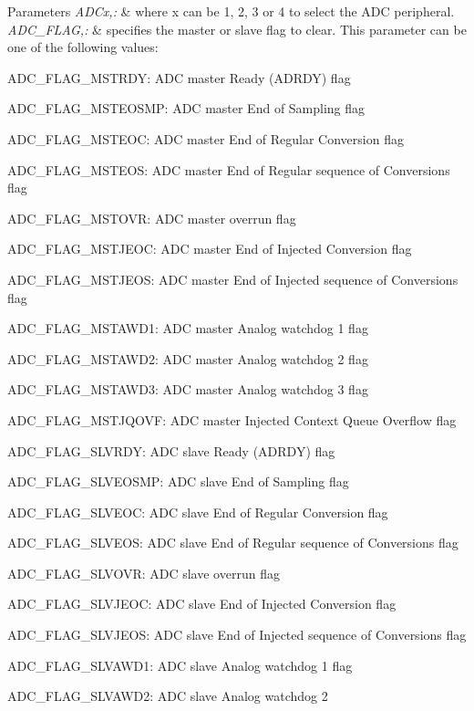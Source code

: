 \begin{DoxyParams}{Parameters}
{\em A\-D\-Cx,\-:} & where x can be 1, 2, 3 or 4 to select the A\-D\-C peripheral. \\
\hline
{\em A\-D\-C\-\_\-\-F\-L\-A\-G,\-:} & specifies the master or slave flag to clear. This parameter can be one of the following values\-: \begin{DoxyItemize}
\item A\-D\-C\-\_\-\-F\-L\-A\-G\-\_\-\-M\-S\-T\-R\-D\-Y\-: A\-D\-C master Ready (A\-D\-R\-D\-Y) flag \item A\-D\-C\-\_\-\-F\-L\-A\-G\-\_\-\-M\-S\-T\-E\-O\-S\-M\-P\-: A\-D\-C master End of Sampling flag \item A\-D\-C\-\_\-\-F\-L\-A\-G\-\_\-\-M\-S\-T\-E\-O\-C\-: A\-D\-C master End of Regular Conversion flag \item A\-D\-C\-\_\-\-F\-L\-A\-G\-\_\-\-M\-S\-T\-E\-O\-S\-: A\-D\-C master End of Regular sequence of Conversions flag \item A\-D\-C\-\_\-\-F\-L\-A\-G\-\_\-\-M\-S\-T\-O\-V\-R\-: A\-D\-C master overrun flag \item A\-D\-C\-\_\-\-F\-L\-A\-G\-\_\-\-M\-S\-T\-J\-E\-O\-C\-: A\-D\-C master End of Injected Conversion flag \item A\-D\-C\-\_\-\-F\-L\-A\-G\-\_\-\-M\-S\-T\-J\-E\-O\-S\-: A\-D\-C master End of Injected sequence of Conversions flag \item A\-D\-C\-\_\-\-F\-L\-A\-G\-\_\-\-M\-S\-T\-A\-W\-D1\-: A\-D\-C master Analog watchdog 1 flag \item A\-D\-C\-\_\-\-F\-L\-A\-G\-\_\-\-M\-S\-T\-A\-W\-D2\-: A\-D\-C master Analog watchdog 2 flag \item A\-D\-C\-\_\-\-F\-L\-A\-G\-\_\-\-M\-S\-T\-A\-W\-D3\-: A\-D\-C master Analog watchdog 3 flag \item A\-D\-C\-\_\-\-F\-L\-A\-G\-\_\-\-M\-S\-T\-J\-Q\-O\-V\-F\-: A\-D\-C master Injected Context Queue Overflow flag \item A\-D\-C\-\_\-\-F\-L\-A\-G\-\_\-\-S\-L\-V\-R\-D\-Y\-: A\-D\-C slave Ready (A\-D\-R\-D\-Y) flag \item A\-D\-C\-\_\-\-F\-L\-A\-G\-\_\-\-S\-L\-V\-E\-O\-S\-M\-P\-: A\-D\-C slave End of Sampling flag \item A\-D\-C\-\_\-\-F\-L\-A\-G\-\_\-\-S\-L\-V\-E\-O\-C\-: A\-D\-C slave End of Regular Conversion flag \item A\-D\-C\-\_\-\-F\-L\-A\-G\-\_\-\-S\-L\-V\-E\-O\-S\-: A\-D\-C slave End of Regular sequence of Conversions flag \item A\-D\-C\-\_\-\-F\-L\-A\-G\-\_\-\-S\-L\-V\-O\-V\-R\-: A\-D\-C slave overrun flag \item A\-D\-C\-\_\-\-F\-L\-A\-G\-\_\-\-S\-L\-V\-J\-E\-O\-C\-: A\-D\-C slave End of Injected Conversion flag \item A\-D\-C\-\_\-\-F\-L\-A\-G\-\_\-\-S\-L\-V\-J\-E\-O\-S\-: A\-D\-C slave End of Injected sequence of Conversions flag \item A\-D\-C\-\_\-\-F\-L\-A\-G\-\_\-\-S\-L\-V\-A\-W\-D1\-: A\-D\-C slave Analog watchdog 1 flag \item A\-D\-C\-\_\-\-F\-L\-A\-G\-\_\-\-S\-L\-V\-A\-W\-D2\-: A\-D\-C slave Analog watchdog 2 
\end{DoxyItemize}
\end{DoxyParams}
